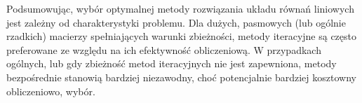 \documentclass[a4paper, 11pt]{article}
\begin{document}
Podsumowując, wybór optymalnej metody rozwiązania układu równań liniowych jest zależny od charakterystyki problemu. Dla dużych, pasmowych (lub ogólnie rzadkich) macierzy spełniających warunki zbieżności, metody iteracyjne są często preferowane ze względu na ich efektywność obliczeniową. W przypadkach ogólnych, lub gdy zbieżność metod iteracyjnych nie jest zapewniona, metody bezpośrednie stanowią bardziej niezawodny, choć potencjalnie bardziej kosztowny obliczeniowo, wybór.
\end{document}
